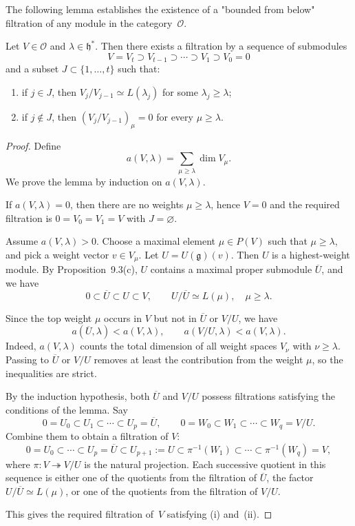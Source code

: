 \documentclass[12pt]{article}
\begin{document}
The following lemma establishes the existence of a "bounded from below" filtration of any module in the category~$\mathcal{O}$.
\begin{lemma}[9.6]
    Let $V \in \mathcal{O}$ and $\lambda \in \mathfrak{h}^*$. Then there exists a filtration
    by a sequence of submodules
    \[
        V = V_t \supset V_{t-1} \supset \cdots \supset V_1 \supset V_0 = 0
    \]
    and a subset $J \subset \{1,\dots,t\}$ such that:
    \begin{enumerate}[label=\textup{(\roman*)}]
        \item if $j \in J$, then $V_j/V_{j-1} \simeq L(\lambda_j)$ for some $\lambda_j \ge \lambda$;
        \item if $j \notin J$, then $(V_j/V_{j-1})_\mu = 0$ for every $\mu \ge \lambda$.
    \end{enumerate}
\end{lemma}

\begin{proof}
    Define
    \[
        a(V,\lambda) = \sum_{\mu \ge \lambda} \dim V_\mu.
    \]
    We prove the lemma by induction on $a(V,\lambda)$.

    If $a(V,\lambda)=0$, then there are no weights $\mu \ge \lambda$, hence
    $V=0$ and the required filtration is $0 = V_0 = V_1 = V$ with $J = \varnothing$.

    Assume $a(V,\lambda) > 0$. Choose a maximal element $\mu \in P(V)$ such that $\mu \ge \lambda$,
    and pick a weight vector $v \in V_\mu$. Let $U = U(\mathfrak{g})(v)$.
    Then $U$ is a highest-weight module. By Proposition~9.3(c),
    $U$ contains a maximal proper submodule $\overline{U}$, and we have
    \[
        0 \subset \overline{U} \subset U \subset V, \qquad
        U/\overline{U} \simeq L(\mu), \quad \mu \ge \lambda.
    \]

    Since the top weight $\mu$ occurs in $V$ but not in $\overline{U}$ or $V/U$,
    we have
    \[
        a(\overline{U},\lambda) < a(V,\lambda), \qquad
        a(V/U,\lambda) < a(V,\lambda).
    \]
    Indeed, $a(V,\lambda)$ counts the total dimension of all weight spaces
    $V_\nu$ with $\nu \ge \lambda$.
    Passing to $\overline{U}$ or $V/U$ removes at least the contribution
    from the weight $\mu$, so the inequalities are strict.

    By the induction hypothesis, both $\overline{U}$ and $V/U$
    possess filtrations satisfying the conditions of the lemma.
    Say
    \[
        0 = U_0 \subset U_1 \subset \cdots \subset U_p = \overline{U},
        \qquad
        0 = W_0 \subset W_1 \subset \cdots \subset W_q = V/U.
    \]
    Combine them to obtain a filtration of $V$:
    \[
        0 = U_0 \subset \cdots \subset U_p = \overline{U}
        \subset U_{p+1} := U
        \subset \pi^{-1}(W_1) \subset \cdots \subset \pi^{-1}(W_q) = V,
    \]
    where $\pi: V \twoheadrightarrow V/U$ is the natural projection.
    Each successive quotient in this sequence is either one of the
    quotients from the filtration of $\overline{U}$, the factor
    $U/\overline{U} \simeq L(\mu)$, or one of the quotients from the
    filtration of $V/U$.

    This gives the required filtration of~$V$ satisfying (i) and~(ii).
\end{proof}
\end{document}
